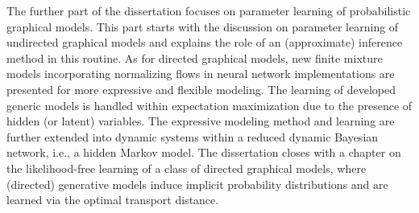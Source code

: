 The further part of the dissertation focuses on parameter learning of probabilistic graphical models. This part starts with the discussion on parameter learning of undirected graphical models and explains the role of an (approximate) inference method in this routine. As for directed graphical models, new finite mixture models incorporating normalizing flows in neural network implementations are presented for more expressive and flexible modeling. The learning of developed generic models is handled within expectation maximization due to the presence of hidden (or latent) variables. The expressive modeling method and learning are further extended into dynamic systems within a reduced dynamic Bayesian network, i.e., a hidden Markov model. The dissertation closes with a chapter on the likelihood-free learning of a class of directed graphical models, where (directed) generative models induce implicit probability distributions and are learned via the optimal transport distance.


